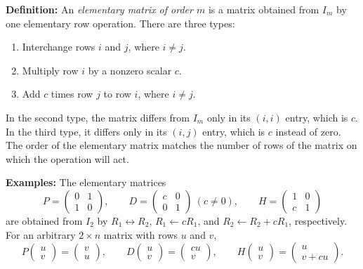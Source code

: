 \documentclass[a4paper,11pt,abstract=true]{scrartcl}
\theoremstyle{dotlessP}
\theoremstyle{dotlessS}
\theoremstyle{remark}
\theoremstyle{definition}
\begin{document}
\begin{definition_box}
\textbf{Definition:} An \emph{elementary
matrix of order $m$} is a matrix obtained from $I_m$ by one elementary
row operation. There are three types:
\begin{enumerate}
    \item Interchange rows $i$ and $j$, where $i\neq j$.
    \item Multiply row $i$ by a nonzero scalar $c$.
    \item Add $c$ times row $j$ to row $i$, where $i\neq j$.
\end{enumerate}
In the second type, the matrix differs from $I_m$ only in its
$(i,i)$ entry, which is $c$. In the third type, it differs only in
its $(i,j)$ entry, which is $c$ instead of zero. The order of the
elementary matrix matches the number of rows of the matrix on which
the operation will act.
\end{definition_box}

\begin{example_box}
\textbf{Examples:} The elementary matrices
\[
P=\begin{pmatrix}0&1\\1&0\end{pmatrix},\qquad
D=\begin{pmatrix}c&0\\0&1\end{pmatrix}\ (c\neq0),\qquad
H=\begin{pmatrix}1&0\\c&1\end{pmatrix}
\]
are obtained from $I_2$ by $R_1\leftrightarrow R_2$,
$R_1\leftarrow cR_1$, and $R_2\leftarrow R_2+cR_1$, respectively.
For an arbitrary $2\times n$ matrix with rows $u$ and $v$,
\[
P\begin{pmatrix}u\\v\end{pmatrix}=\begin{pmatrix}v\\u\end{pmatrix},
\qquad
D\begin{pmatrix}u\\v\end{pmatrix}=\begin{pmatrix}cu\\v\end{pmatrix},
\qquad
H\begin{pmatrix}u\\v\end{pmatrix}=\begin{pmatrix}u\\v+cu\end{pmatrix}.
\]
\end{example_box}
\end{document}
